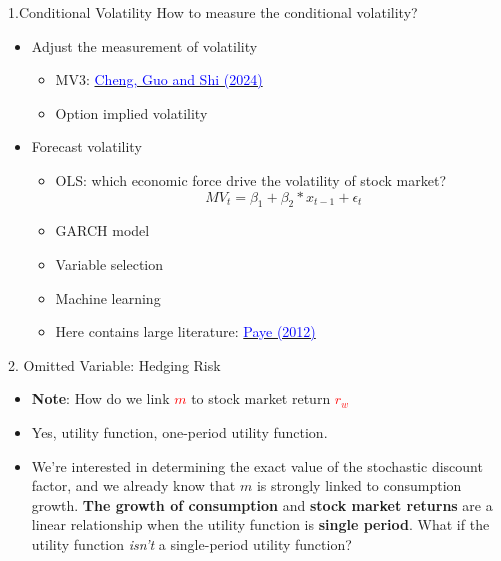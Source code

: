 \documentclass{beamer}
\begin{document}
\begin{frame}{1.Conditional Volatility}
	How to measure the conditional volatility?

	\begin{itemize}
		\item Adjust the measurement of volatility
		\begin{itemize}
			\item MV3: \href{https://www.sciencedirect.com/science/article/pii/S0378426624000372}{\textcolor{blue}{Cheng, Guo and Shi (2024)}}
			\item Option implied volatility
		\end{itemize}
		\item Forecast volatility
		\begin{itemize}
			\item OLS: which economic force drive the volatility of stock market?
			\begin{equation}
				MV_t = \beta_1 + \beta_2 * x_{t-1} + \epsilon_{t}
			\end{equation}
			\item GARCH model
			\item Variable selection
			\item Machine learning
			\item Here contains large literature: \href{https://doi.org/10.1016/j.jfineco.2012.06.005}{\textcolor{blue}{Paye (2012)}}
		\end{itemize}
	\end{itemize}
\end{frame}

\begin{frame}{2. Omitted Variable: Hedging Risk}
	\begin{itemize}
	\item \textbf{Note}: How do we link \textcolor{red}{$ m $} to stock market return \textcolor{red}{$r_{w}$} 
	\item Yes, utility function, one-period utility function.
	\item We're interested in determining the exact value of the stochastic discount factor, and we already know that $ m $ is strongly linked to consumption growth. \textbf{The growth of consumption} and \textbf{stock market returns} are a linear relationship when the utility function is \textbf{single period}. What if the utility function \textit{isn't} a single-period utility function?
\end{itemize}
\end{frame}
\end{document}
